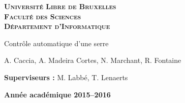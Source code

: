 \documentclass[a4paper,10pt]{report}
\begin{document}
\begin{titlepage}
    \begin{center}
        \textbf{\textsc{Université Libre de Bruxelles}}\\
        \textbf{\textsc{Faculté des Sciences}}\\
        \textbf{\textsc{Département d'Informatique}}

        \vfill{}
        \vfill{}

        \begin{center}
            {\Huge Contrôle automatique d'une serre}
        \end{center}

        {\Huge \par}

        \begin{center}
            {\large A. Caccia, A. Madeira Cortes, N. Marchant, R. Fontaine}
        \end{center}

        {\Huge \par}
        \vfill{}
        \vfill{}

        \begin{flushleft}
            {\large \textbf{Superviseurs :} M. Labbé, T. Lenaerts}
            \hfill{}
        \end{flushleft}

        {\large\par}
        \vfill{}
        \vfill{}

        \textbf{Année académique 2015--2016}
    \end{center}
\end{titlepage}
\end{document}
